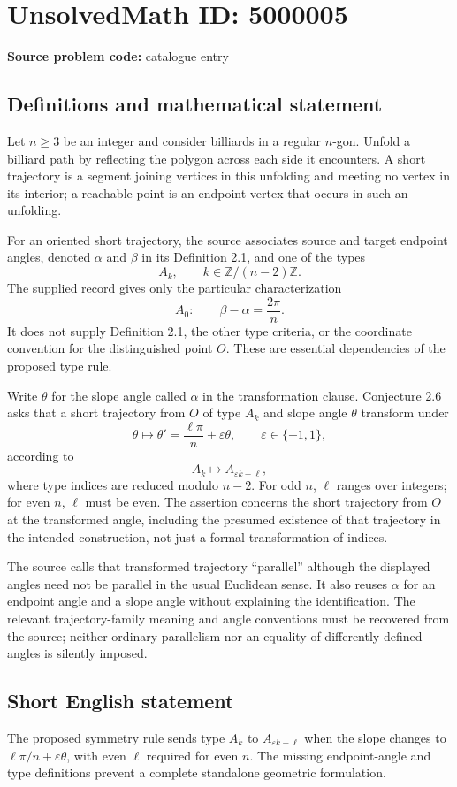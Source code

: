 \documentclass[11pt]{article}
\newcommand{\Z}{\mathbb{Z}}
\begin{document}
\section*{UnsolvedMath ID: 5000005}
\textbf{Source problem code:} catalogue entry
\subsection{Definitions and mathematical statement}
Let $n\ge3$ be an integer and consider billiards in a regular $n$-gon. Unfold a billiard path by reflecting the polygon across each side it encounters. A short trajectory is a segment joining vertices in this unfolding and meeting no vertex in its interior; a reachable point is an endpoint vertex that occurs in such an unfolding.

For an oriented short trajectory, the source associates source and target endpoint angles, denoted $\alpha$ and $\beta$ in its Definition 2.1, and one of the types
\[
 A_k,\qquad k\in\Z/(n-2)\Z.
\]
The supplied record gives only the particular characterization
\[
 A_0:\qquad \beta-\alpha=\frac{2\pi}{n}.
\]
It does not supply Definition 2.1, the other type criteria, or the coordinate convention for the distinguished point $O$. These are essential dependencies of the proposed type rule.

Write $\theta$ for the slope angle called $\alpha$ in the transformation clause. Conjecture 2.6 asks that a short trajectory from $O$ of type $A_k$ and slope angle $\theta$ transform under
\[
 \theta\longmapsto\theta'=\frac{\ell\pi}{n}+\varepsilon\theta,
 \qquad\varepsilon\in\{-1,1\},
\]
according to
\[
 A_k\longmapsto A_{\varepsilon k-\ell},
\]
where type indices are reduced modulo $n-2$. For odd $n$, $\ell$ ranges over integers; for even $n$, $\ell$ must be even. The assertion concerns the short trajectory from $O$ at the transformed angle, including the presumed existence of that trajectory in the intended construction, not just a formal transformation of indices.

The source calls that transformed trajectory ``parallel'' although the displayed angles need not be parallel in the usual Euclidean sense. It also reuses $\alpha$ for an endpoint angle and a slope angle without explaining the identification. The relevant trajectory-family meaning and angle conventions must be recovered from the source; neither ordinary parallelism nor an equality of differently defined angles is silently imposed.
\subsection{Short English statement}
The proposed symmetry rule sends type $A_k$ to $A_{\varepsilon k-\ell}$ when the slope changes to $\ell\pi/n+\varepsilon\theta$, with even $\ell$ required for even $n$. The missing endpoint-angle and type definitions prevent a complete standalone geometric formulation.
\end{document}
